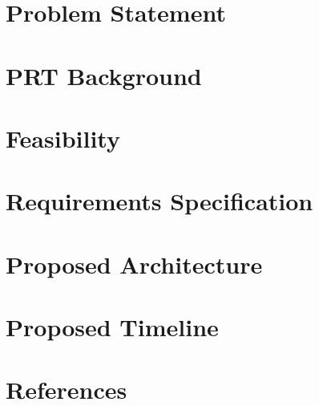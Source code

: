 \documentclass[10pt]{article}
\begin{document}
    

    \tableofcontents
    \newpage

    \section{Problem Statement}
    

    \section{PRT Background}
    

    \section{Feasibility}
    

    \section{Requirements Specification}
    

    \section{Proposed Architecture}
    

    \section{Proposed Timeline}
    

    \section{References}
    
\end{document}
